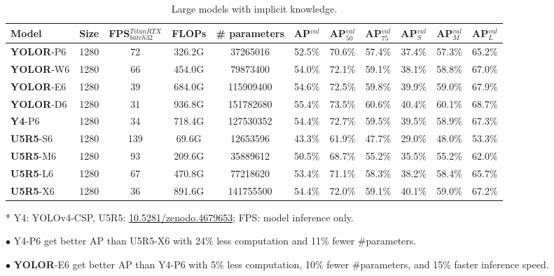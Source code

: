 \documentclass[10pt,twocolumn,letterpaper]{article}
\begin{document}
\begin{table*}[t]
	\centering
	\begin{threeparttable}[t]
		\footnotesize
		\caption{Large models with implicit knowledge.}
		\label{table:large}
		\setlength\tabcolsep{5.8pt}
		\begin{tabular}{lcccccccccc}
			\toprule
			\textbf{Model} & \textbf{Size} & \textbf{FPS$^{TitanRTX}_{batch 32}$} & \textbf{FLOPs} & \textbf{\# parameters} & \textbf{AP$^{val}$} & \textbf{AP$^{val}_{50}$} & \textbf{AP$^{val}_{75}$} & \textbf{AP$^{val}_{S}$} & \textbf{AP$^{val}_{M}$} & \textbf{AP$^{val}_{L}$} \\				
			\midrule
			\textbf{YOLOR}-P6 & 1280 & 72 & 326.2G & 37265016 & 52.5\% & 70.6\% & 57.4\% & 37.4\% & 57.3\% & 65.2\% \\
			\textbf{YOLOR}-W6 & 1280 & 66 & 454.0G & 79873400 & 54.0\% & 72.1\% & 59.1\% & 38.1\% & 58.8\% & 67.0\% \\
			\textbf{YOLOR}-E6 & 1280 & 39 & 684.0G & 115909400 & 54.6\% & 72.5\% & 59.8\% & 39.9\% & 59.0\% & 67.9\% \\
			\textbf{YOLOR}-D6 & 1280 & 31 & 936.8G & 151782680 & 55.4\% & 73.5\% & 60.6\% & 40.4\% & 60.1\% & 68.7\% \\
			\midrule
			\textbf{Y4}-P6 & 1280 & 34 & 718.4G & 127530352 & 54.4\% & 72.7\% & 59.5\% & 39.5\% & 58.9\% & 67.3\% \\
			\midrule
			\textbf{U5R5}-S6 & 1280 & 139 & 69.6G & 12653596 & 43.3\% & 61.9\% & 47.7\% & 29.0\% & 48.0\% & 53.3\% \\
			\textbf{U5R5}-M6 & 1280 & 93 & 209.6G & 35889612 & 50.5\% & 68.7\% & 55.2\% & 35.5\% & 55.2\% & 62.0\% \\
			\textbf{U5R5}-L6 & 1280 & 67 & 470.8G & 77218620 & 53.4\% & 71.1\% & 58.3\% & 38.2\% & 58.4\% & 65.7\% \\
			\textbf{U5R5}-X6 & 1280 & 36 & 891.6G & 141755500 & 54.4\% & 72.0\% & 59.1\% & 40.1\% & 59.0\% & 67.2\% \\
			\bottomrule
		\end{tabular}
		\begin{tablenotes}[flushleft]
			\footnotesize
			\item[*] Y4: YOLOv4-CSP, U5R5: \url{10.5281/zenodo.4679653}; FPS: model inference only.
			\item[$\bullet$] Y4-P6 get better AP than U5R5-X6 with 24\% less computation and 11\% fewer \#parameters.
			\item[$\bullet$] \textbf{YOLOR}-E6 get better AP than Y4-P6 with 5\% less computation, 10\% fewer \#parameters, and 15\% faster inference speed.
		\end{tablenotes}
	\end{threeparttable}
\end{table*}
\end{document}
